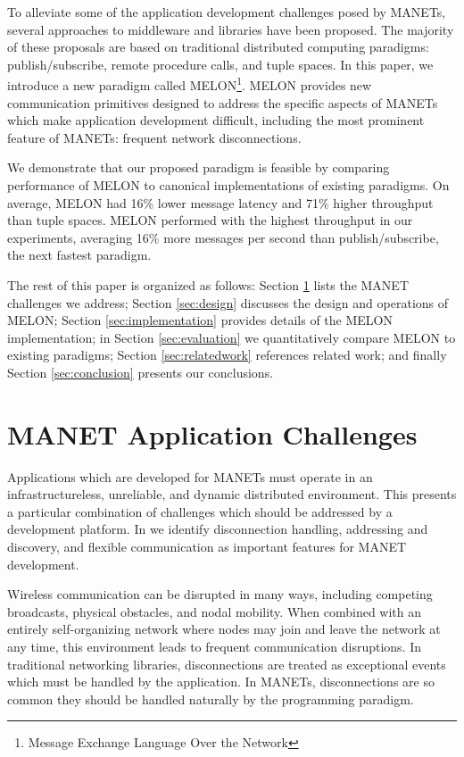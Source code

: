 \documentclass[lnicst]{svmultln}
\begin{document}
To alleviate some of the application development challenges posed by MANETs, several approaches to middleware and libraries have been proposed. The majority of these proposals are based on traditional distributed computing paradigms: publish/subscribe\cite{psfaces}, remote procedure calls\cite{rpc}, and tuple spaces\cite{linda}. In this paper, we introduce a new paradigm called MELON\footnote{Message Exchange Language Over the Network}. MELON provides new communication primitives designed to address the specific aspects of MANETs which make application development difficult, including the most prominent feature of MANETs: frequent network disconnections.

We demonstrate that our proposed paradigm is feasible by comparing performance of MELON to canonical implementations of existing paradigms. On average, MELON had 16\% lower message latency and 71\% higher throughput than tuple spaces. MELON performed with the highest throughput in our experiments, averaging 16\% more messages per second than publish/subscribe, the next fastest paradigm.

The rest of this paper is organized as follows: Section \ref{sec:challenges} lists the MANET challenges we address; Section \ref{sec:design} discusses the design and operations of MELON; Section \ref{sec:implementation} provides details of the MELON implementation; in Section \ref{sec:evaluation} we quantitatively compare MELON to existing paradigms; Section \ref{sec:relatedwork} references related work; and finally Section \ref{sec:conclusion} presents our conclusions.

\section{MANET Application Challenges}\label{sec:challenges}

Applications which are developed for MANETs must operate in an infrastructureless, unreliable, and dynamic distributed environment. This presents a particular combination of challenges which should be addressed by a development platform. In \cite{mine} we identify disconnection handling, addressing and discovery, and flexible communication as important features for MANET development.

Wireless communication can be disrupted in many ways, including competing broadcasts, physical obstacles, and nodal mobility. When combined with an entirely self-organizing network where nodes may join and leave the network at any time, this environment leads to frequent communication disruptions. In traditional networking libraries, disconnections are treated as exceptional events which must be handled by the application. In MANETs, disconnections are so common they should be handled naturally by the programming paradigm.
\end{document}
